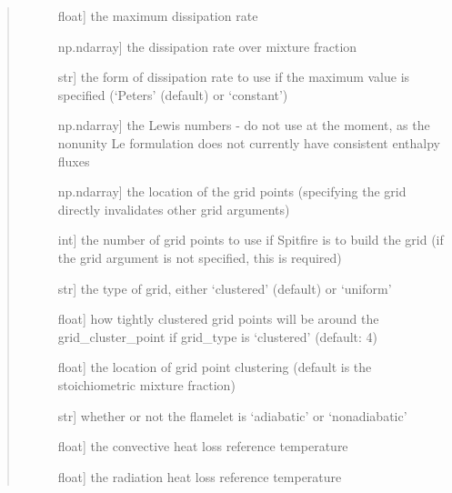 \documentclass[letterpaper,10pt,english]{sphinxmanual}
\begin{document}
\begin{fulllineitems}
\begin{quote}
\begin{description}
\begin{description}
\item[{}] \leavevmode{[}float{]}
the maximum dissipation rate

\item[{}] \leavevmode{[}np.ndarray{]}
the dissipation rate over mixture fraction

\item[{}] \leavevmode{[}str{]}
the form of dissipation rate to use if the maximum value is specified (‘Peters’ (default) or ‘constant’)

\item[{}] \leavevmode{[}np.ndarray{]}
the Lewis numbers - do not use at the moment, as the nonunity Le formulation does not currently have consistent enthalpy fluxes

\item[{}] \leavevmode{[}np.ndarray{]}
the location of the grid points (specifying the grid directly invalidates other grid arguments)

\item[{}] \leavevmode{[}int{]}
the number of grid points to use if Spitfire is to build the grid (if the grid argument is not specified, this is required)

\item[{}] \leavevmode{[}str{]}
the type of grid, either ‘clustered’ (default) or ‘uniform’

\item[{}] \leavevmode{[}float{]}
how tightly clustered grid points will be around the grid\_cluster\_point if grid\_type is ‘clustered’ (default: 4)

\item[{}] \leavevmode{[}float{]}
the location of grid point clustering (default is the stoichiometric mixture fraction)

\item[{}] \leavevmode{[}str{]}
whether or not the flamelet is ‘adiabatic’ or ‘nonadiabatic’

\item[{}] \leavevmode{[}float{]}
the convective heat loss reference temperature

\item[{}] \leavevmode{[}float{]}
the radiation heat loss reference temperature


\end{description}
\end{description}
\end{quote}
\end{fulllineitems}
\end{document}
